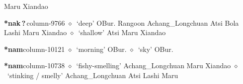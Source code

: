          Maru 
\hspace{1ex}
         Xiandao 
  \item {\footnotesize \textbf{*nak\,?\,}}{\tiny column-9766}
         $\diamond$~`deep'
         OBur. 
\hspace{1ex}
         Rangoon 
\hspace{1ex}
         Achang\_Longchuan 
\hspace{1ex}
         Atsi 
\hspace{1ex}
         Bola 
\hspace{1ex}
         Lashi 
\hspace{1ex}
         Maru 
\hspace{1ex}
         Xiandao 
\hspace{1ex}
         $\diamond$~`shallow'
         Atsi 
\hspace{1ex}
         Maru 
\hspace{1ex}
         Xiandao 
  \item {\footnotesize \textbf{*nam}}{\tiny column-10121}
         $\diamond$~`morning'
         OBur. 
\hspace{1ex}
         $\diamond$~`sky'
         OBur. 
  \item {\footnotesize \textbf{*nam}}{\tiny column-10738}
         $\diamond$~`fishy-smelling'
         Achang\_Longchuan 
\hspace{1ex}
         Maru 
\hspace{1ex}
         Xiandao 
\hspace{1ex}
         $\diamond$~`stinking / smelly'
         Achang\_Longchuan 
\hspace{1ex}
         Atsi 
\hspace{1ex}
         Lashi 
\hspace{1ex}
         Maru 
\hspace{1ex}
